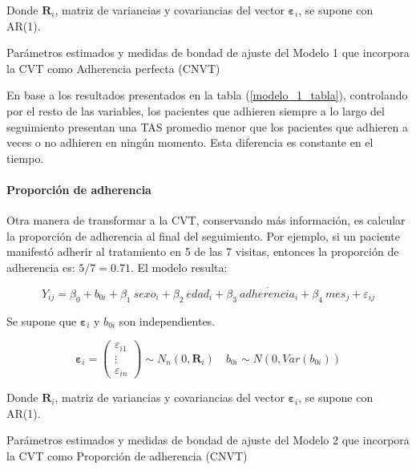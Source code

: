 \documentclass[spanish]{article}
\numberwithin{figure}{subsection}
\numberwithin{equation}{subsection}
\numberwithin{table}{subsection}
\begin{document}
Donde $\bm{R}_i$, matriz de variancias y covariancias del vector
$\bm{\varepsilon}_{i}$, se supone con AR(1).

\begin{table}[H]
	\centering
	\caption{Parámetros estimados y medidas de bondad de ajuste del Modelo 1 que incorpora la CVT como Adherencia perfecta (CNVT)}
	\label{modelo_1_tabla}
	
\end{table}

En base a los resultados presentados en la tabla (\ref{modelo_1_tabla}),
controlando por el resto de las variables, los pacientes que adhieren siempre a
lo largo del seguimiento presentan una TAS promedio menor que los pacientes que
adhieren a veces o no adhieren en ningún momento. Esta diferencia es constante
en el tiempo.

\paragraph{Proporción de adherencia} \mbox{}

Otra manera de transformar a la CVT, conservando más información, es calcular la
proporción de adherencia al final del seguimiento. Por ejemplo, si un paciente
manifestó adherir al tratamiento en 5 de las 7 visitas, entonces la proporción
de adherencia es: $5/7= 0.71$. El modelo resulta:

\begin{equation}
	\label{modelo_2}
	Y_{ij} = \beta_0 + b_{0i} + \beta_1\ sexo_i + \beta_2\ edad_i + \beta_3\ \overline{adherencia}_i
	+ \beta_4\ mes_j + \varepsilon_{ij}
\end{equation}

Se supone que $\bm{\varepsilon}_i$ y $b_{0i}$ son independientes.

\[ 
	\bm{\varepsilon}_i = \begin{pmatrix} \varepsilon_{i1} \\ \vdots \\ \varepsilon_{in} \end{pmatrix} \sim N_{n}(0, \bm{R}_i)
	\quad
	b_{0i} \sim N(0, Var(b_{0i}))
\]

Donde $\bm{R}_i$, matriz de variancias y covariancias del vector
$\bm{\varepsilon}_{i}$, se supone con AR(1).

\begin{table}[H]
	\centering
	\caption{Parámetros estimados y medidas de bondad de ajuste del Modelo 2 que incorpora la CVT como Proporción de adherencia (CNVT)}
	\label{modelo_2_tabla}
	
\end{table}
\end{document}
